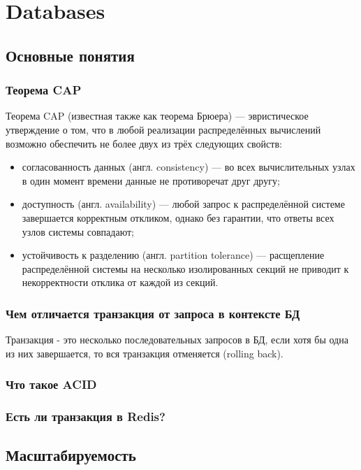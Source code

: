 \part{Databases}

\chapter{Основные понятия}

\section{Теорема CAP}

Теорема CAP (известная также как теорема Брюера) — эвристическое утверждение о том, что в любой реализации распределённых вычислений возможно обеспечить не более двух из трёх следующих свойств:
\begin{itemize}

 \item согласованность данных (англ. consistency) — во всех вычислительных узлах в один момент времени данные не противоречат друг другу;
\item доступность (англ. availability) — любой запрос к распределённой системе завершается корректным откликом, однако без гарантии, что ответы всех узлов системы совпадают;
\item устойчивость к разделению (англ. partition tolerance) — расщепление распределённой системы на несколько изолированных секций не приводит к некорректности отклика от каждой из секций.

\end{itemize}

\section{Чем отличается транзакция от запроса в контексте БД}
Транзакция - это несколько последовательных запросов в БД, если хотя бы одна из них завершается, то вся транзакция отменяется (rolling back).

\section{Что такое ACID}
\section{Есть ли транзакция в Redis?}

\chapter{Масштабируемость}

